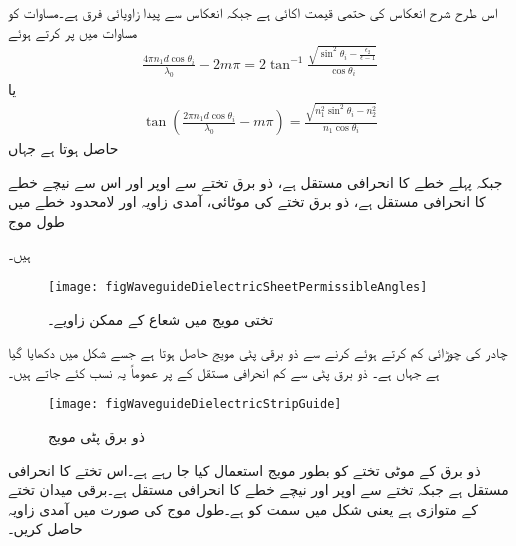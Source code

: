اس طرح شرح انعکاس  کی حتمی قیمت اکائی ہے جبکہ انعکاس سے پیدا زاویائی فرق  ہے۔مساوات  کو مساوات  میں پر کرتے ہوئے
\begin{align}
\frac{4 \pi n_1 d \cos \theta_i}{\lambda_0}-2 m\pi=2\tan^{-1}\frac{\sqrt{\sin^2 \theta_i -\frac{\epsilon_2}{\epsilon-1}} }{\cos \theta_i}
\end{align}
یا
\begin{align}\label{مساوات_مویج_تختی_مویج_زاویہ}
\tan \left( \frac{2 \pi n_1 d \cos \theta_i}{\lambda_0}-m \pi\right)=\frac{\sqrt{n_1^2 \sin^2 \theta_i -n_2^2}}{n_1 \cos \theta_i}
\end{align}
حاصل ہوتا ہے جہاں
\begin{description}
 جبکہ
 پہلے خطے کا انحرافی مستقل  ہے،
 ذو برق تختے سے اوپر اور اس سے نیچے خطے کا انحرافی مستقل  ہے،
 ذو برق تختے کی موٹائی،
 آمدی زاویہ اور
 لامحدود خطے میں طول موج
\end{description}
ہیں۔
\begin{figure}
\centering
\texttt{[image: figWaveguideDielectricSheetPermissibleAngles]}
\caption{تختی مویج میں شعاع کے ممکن زاویے۔}
\label{شکل_تختی_مویج_شعاع_ممکن_زاویے}
\end{figure}

چادر کی چوڑائی کم کرتے ہوئے  کرنے سے  ذو برقی پٹی مویج حاصل ہوتا ہے جسے شکل  میں دکھایا گیا ہے جہاں  ہے۔ ذو برق پٹی سے کم انحرافی مستقل کے  پر عموماً یہ نسب کئے جاتے ہیں۔ 


\begin{figure}
\centering
\texttt{[image: figWaveguideDielectricStripGuide]}
\caption{ذو برق پٹی مویج}
\label{شکل_مویج_ذو_برق_پٹی}
\end{figure}
ذو برق کے  موٹی تختے کو بطور مویج استعمال کیا جا رہے ہے۔اس تختے کا انحرافی مستقل  ہے جبکہ تختے سے اوپر اور نیچے خطے کا انحرافی مستقل  ہے۔برقی میدان تختے کے متوازی ہے یعنی شکل  میں  سمت کو ہے۔طول موج  کی صورت میں آمدی زاویہ  حاصل کریں۔

